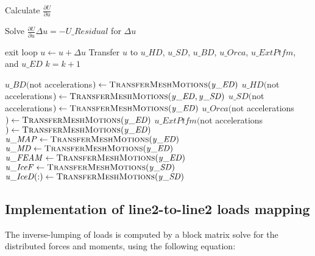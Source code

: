 \documentclass[10pt,letterpaper,oneside,notitlepage]{article}
\begin{document}
\begin{algorithmic}[1]
         \State Calculate $\frac{\partial U}{\partial u}$
      \EndIf
      

      \State Solve  $\frac{\partial U}{\partial u} \Delta u = - \mathit{U\_Residual}$ for $\Delta u$

      \State    
       
         \State exit loop
      \EndIf
      \State
      \State $u \gets u + \Delta u$
      \State Transfer $u$ to $\mathit{u\_HD}$, $\mathit{u\_SD}$, $\mathit{u\_BD}$, $\mathit{u\_Orca}$, $\mathit{u\_ExtPtfm}$, and $\mathit{u\_ED}$
      \State $k=k+1$
      
   \EndLoop   
   
   \State{}
   \State 
   
   \State$\mathit{u\_BD}($not accelerations$) \gets \Call{TransferMeshMotions}{\mathit{y\_ED}}$
   \State$\mathit{u\_HD}($not accelerations$) \gets \Call{TransferMeshMotions}{\mathit{y\_ED},\mathit{y\_SD}}$
   \State$\mathit{u\_SD}($not accelerations$) \gets \Call{TransferMeshMotions}{\mathit{y\_ED}}$
   \State$\mathit{u\_Orca}($not accelerations$) \gets \Call{TransferMeshMotions}{\mathit{y\_ED}}$   \State$\mathit{u\_ExtPtfm}($not accelerations$) \gets \Call{TransferMeshMotions}{\mathit{y\_ED}}$
  \State 
   \State $\mathit{u\_MAP}     \gets \Call{TransferMeshMotions}{\mathit{y\_ED}}$
   \State $\mathit{u\_MD}      \gets \Call{TransferMeshMotions}{\mathit{y\_ED}}$
   \State $\mathit{u\_FEAM}    \gets \Call{TransferMeshMotions}{\mathit{y\_ED}}$
   \State $\mathit{u\_IceF}    \gets \Call{TransferMeshMotions}{\mathit{y\_SD}}$
   \State $\mathit{u\_IceD(:)} \gets \Call{TransferMeshMotions}{\mathit{y\_SD}}$
         
\EndProcedure
\end{algorithmic}


\subsection {Implementation of line2-to-line2 loads mapping}
The inverse-lumping of loads is computed by a block matrix solve for the distributed forces and moments, 
using the following equation:
\end{document}
